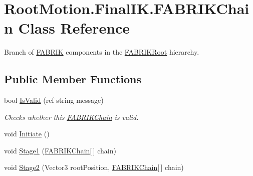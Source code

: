 \hypertarget{class_root_motion_1_1_final_i_k_1_1_f_a_b_r_i_k_chain}{}\section{Root\+Motion.\+Final\+I\+K.\+F\+A\+B\+R\+I\+K\+Chain Class Reference}
\label{class_root_motion_1_1_final_i_k_1_1_f_a_b_r_i_k_chain}


Branch of \mbox{\hyperlink{class_root_motion_1_1_final_i_k_1_1_f_a_b_r_i_k}{F\+A\+B\+R\+IK}} components in the \mbox{\hyperlink{class_root_motion_1_1_final_i_k_1_1_f_a_b_r_i_k_root}{F\+A\+B\+R\+I\+K\+Root}} hierarchy.  


\subsection*{Public Member Functions}
\begin{DoxyCompactItemize}
\item 
bool \mbox{\hyperlink{class_root_motion_1_1_final_i_k_1_1_f_a_b_r_i_k_chain_a1619be58decabb331d41a7e0b13c1ba3}{Is\+Valid}} (ref string message)
\begin{DoxyCompactList}\small\item\em Checks whether this \mbox{\hyperlink{class_root_motion_1_1_final_i_k_1_1_f_a_b_r_i_k_chain}{F\+A\+B\+R\+I\+K\+Chain}} is valid. \end{DoxyCompactList}\item 
void \mbox{\hyperlink{class_root_motion_1_1_final_i_k_1_1_f_a_b_r_i_k_chain_a4039503a9c471cdbc9538705a34f64e1}{Initiate}} ()
\item 
void \mbox{\hyperlink{class_root_motion_1_1_final_i_k_1_1_f_a_b_r_i_k_chain_a641f7389ee136de95e029077d8ec73e3}{Stage1}} (\mbox{\hyperlink{class_root_motion_1_1_final_i_k_1_1_f_a_b_r_i_k_chain}{F\+A\+B\+R\+I\+K\+Chain}}\mbox{[}$\,$\mbox{]} chain)
\item 
void \mbox{\hyperlink{class_root_motion_1_1_final_i_k_1_1_f_a_b_r_i_k_chain_ae43e03d528c7114759922087f33eeb1e}{Stage2}} (Vector3 root\+Position, \mbox{\hyperlink{class_root_motion_1_1_final_i_k_1_1_f_a_b_r_i_k_chain}{F\+A\+B\+R\+I\+K\+Chain}}\mbox{[}$\,$\mbox{]} chain)
\end{DoxyCompactItemize}
